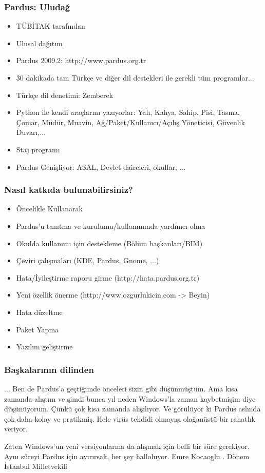 \documentclass{beamer}
\begin{document}
	\begin{frame}
	 	\frametitle{Pardus: Uludağ}
		\begin{itemize}[<+->]
		 \item TÜBİTAK tarafından
		 \item Ulusal dağıtım
		 \item Pardus 2009.2: http://www.pardus.org.tr
		 \item 30 dakikada tam Türkçe ve diğer dil destekleri ile gerekli tüm programlar...
		 \item Türkçe dil denetimi: Zemberek
		 \item Python ile kendi araçlarını yazıyorlar: Yalı, Kahya, Sahip, Pisi, Tasma, Çomar, Müdür, Muavin, Ağ/Paket/Kullanıcı/Açılış Yöneticisi, Güvenlik Duvarı,...
		 \item Staj programı
		 \item Pardus Genişliyor: ASAL, Devlet daireleri, okullar, ...		 
		\end{itemize}

	\end{frame}
	\begin{frame}
	 \frametitle{Nasıl katkıda bulunabilirsiniz?}
		\begin{itemize}[<+->]
		 \item Öncelikle Kullanarak
		 \item Pardus'u tanıtma ve kurulumu/kullanımında yardımcı olma
		 \item Okulda kullanımı için destekleme (Bölüm başkanları/BIM)
		 \item Çeviri çalışmaları (KDE, Pardus, Gnome, ...)
		 \item Hata/İyileştirme raporu girme (http://hata.pardus.org.tr)
		 \item Yeni özellik önerme (http://www.ozgurlukicin.com -> Beyin)
		 \item Hata düzeltme
		 \item Paket Yapma
		 \item Yazılım geliştirme
		\end{itemize}

	\end{frame}

	\begin{frame}
	\frametitle{Başkalarının dilinden}
	... Ben de Pardus'a geçtiğimde önceleri sizin gibi
	düşünmüştüm. Ama kısa zamanda alıştım ve şimdi bunca yıl neden Windows'la
	zaman kaybetmişim diye düşünüyorum. Çünkü çok kısa zamanda alışılıyor. Ve
	görülüyor ki Pardus aslında çok daha kolay ve pratikmiş. Hele virüs tehdidi
	olmayışı olağanüstü bir rahatlık veriyor.
	
	Zaten Windows'un yeni versiyonlarına da alışmak için belli bir süre gerekiyor.
	Aynı süreyi Pardus için ayırırsak, her şey halloluyor.
	\newline
	\newline
	Emre Kocaoglu
	. Dönem İstanbul Milletvekili
	\end{frame}
	
\end{document}
